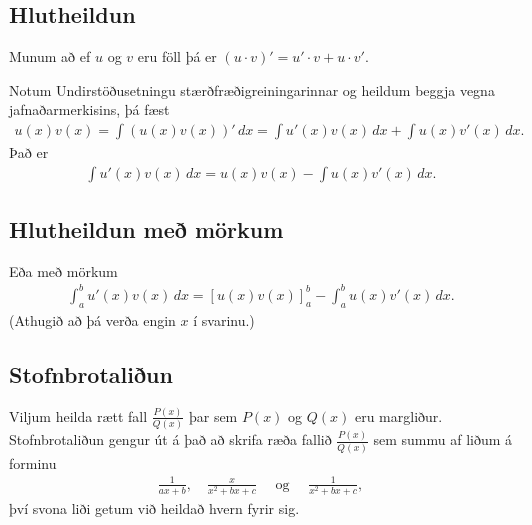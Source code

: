 \documentclass[b5paper,11pt,icelandic]{sphinxmanual}
\begin{document}
\subsection{Hlutheildun}
\label{kafli06:hlutheildun}\label{kafli06:index-11}
Munum að ef \(u\) og \(v\) eru föll þá er
\((u\cdot v)' = u'\cdot v + u \cdot v'\).

Notum Undirstöðusetningu stærðfræðigreiningarinnar og heildum beggja
vegna jafnaðarmerkisins, þá fæst
\begin{equation*}
\begin{split}u(x)v(x) = \int (u(x)v(x))'\, dx = \int u'(x)v(x)\, dx + \int u(x)v'(x)\, dx.\end{split}
\end{equation*}
Það er
\begin{equation*}
\begin{split}\int u'(x)v(x)\, dx = u(x)v(x) -  \int u(x)v'(x)\, dx.\end{split}
\end{equation*}

\subsection{Hlutheildun með mörkum}
\label{kafli06:hlutheildun-me-morkum}
Eða með mörkum
\begin{equation*}
\begin{split}\int_a^b u'(x)v(x)\, dx = [u(x)v(x)]_a^b -  \int_a^b u(x)v'(x)\, dx.\end{split}
\end{equation*}
(Athugið að þá verða engin \(x\) í svarinu.)


\subsection{Stofnbrotaliðun}
\label{kafli06:stofnbrotaliun}\label{kafli06:index-12}
Viljum heilda rætt fall \(\frac{P(x)}{Q(x)}\) þar sem \(P(x)\)
og \(Q(x)\) eru margliður. Stofnbrotaliðun gengur út á það að skrifa ræða fallið
\(\frac{P(x)}{Q(x)}\) sem summu af liðum á forminu
\begin{equation*}
\begin{split}\frac{1}{ax+b}, \quad \frac{x}{x^2+bx+c} \quad\text{ og }\quad \frac{1}{x^2+bx+c},\end{split}
\end{equation*}
því svona liði getum við heildað hvern fyrir sig.
\end{document}
